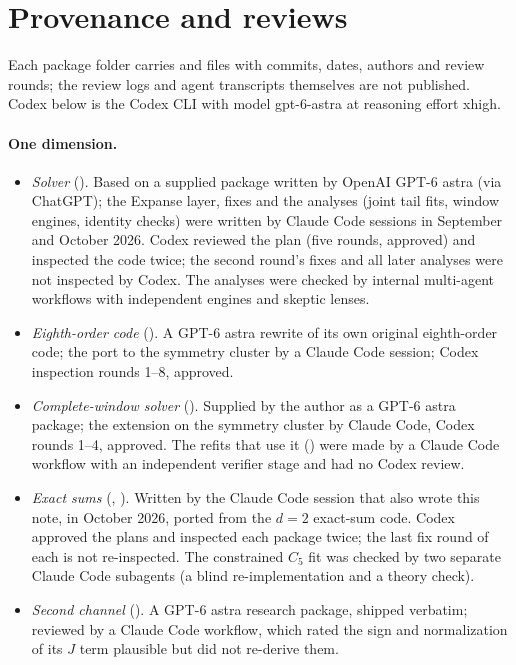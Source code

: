 \section{Provenance and reviews}\label{sec:provenance}
Each package folder carries  and  files with commits, dates, authors and review rounds;
the review logs and agent transcripts themselves are not published. Codex below is the Codex CLI with model
gpt-6-astra at reasoning effort xhigh.

\paragraph{One dimension.}
\begin{itemize}
\item \emph{Solver} (). Based on a supplied package written by OpenAI GPT-6 astra (via
 ChatGPT); the Expanse layer, fixes and the analyses (joint tail fits, window engines, identity checks) were written by
 Claude Code sessions in September and October 2026. Codex reviewed the plan (five rounds, approved) and inspected the
 code twice; the second round's fixes and all later analyses were not inspected by Codex. The analyses were checked by
 internal multi-agent workflows with independent engines and skeptic lenses.
\item \emph{Eighth-order code} (). A GPT-6 astra rewrite of its own original eighth-order code; the
 port to the symmetry cluster by a Claude Code session; Codex inspection rounds 1--8, approved.
\item \emph{Complete-window solver} (). Supplied by the author as a GPT-6 astra
 package; the extension on the symmetry cluster by Claude Code, Codex rounds 1--4, approved. The refits that use it
 () were made by a Claude Code workflow with an independent verifier stage and had no Codex
 review.
\item \emph{Exact sums} (, ). Written by the Claude Code session that
 also wrote this note, in October 2026, ported from the $d=2$ exact-sum code. Codex approved the plans and inspected each
 package twice; the last fix round of each is not re-inspected. The constrained $C_5$ fit was checked by two separate
 Claude Code subagents (a blind re-implementation and a theory check).
\item \emph{Second channel} (). A GPT-6 astra research package, shipped
 verbatim; reviewed by a Claude Code workflow, which rated the sign and normalization of its $J$ term plausible but did
 not re-derive them.
\end{itemize}

